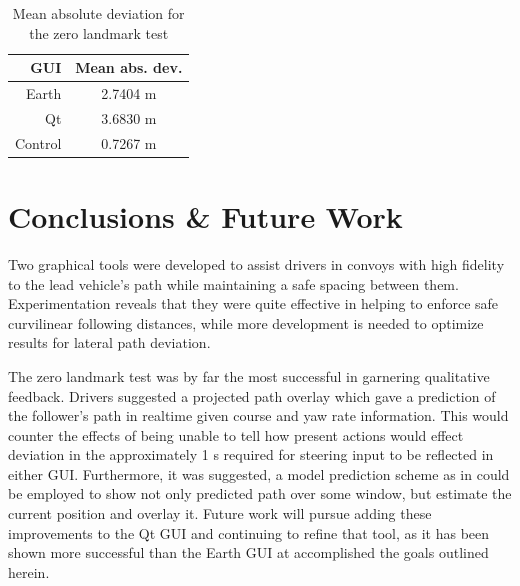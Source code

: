 \documentclass[twocolumn,10pt]{article}
\begin{document}
    \begin{table}[htbp] \centering \caption{Mean absolute deviation for the zero landmark test}
    \begin{tabular}{r|c} 
        GUI&    Mean abs. dev. \\ \hline\hline
        Earth&      2.7404 m \\
        Qt&   3.6830 m \\
        Control&    0.7267 m \\ \hline   
    \end{tabular} \label{tab:zero_dev_mean} \end{table}



\section*{Conclusions \& Future Work}

  Two graphical tools were developed to assist drivers in convoys with high fidelity to the lead vehicle’s path while maintaining a safe spacing between them.  Experimentation reveals that they were quite effective in helping to enforce safe curvilinear following distances, while more development is needed to optimize results for lateral path deviation.  

  The zero landmark test was by far the most successful in garnering qualitative feedback.  Drivers suggested a projected path overlay which gave a prediction of the follower’s path in realtime given course and yaw rate information.  This would counter the effects of being unable to tell how present actions would effect deviation in the approximately 1 s required for steering input to be reflected in either GUI.  Furthermore, it was suggested, a model prediction scheme as in \cite{williamthesis} could be employed to show not only predicted path over some window, but estimate the current position and overlay it.  Future work will pursue adding these improvements to the Qt GUI and continuing to refine that tool, as it has been shown more successful than the Earth GUI at accomplished the goals outlined herein.



\nocite{CofieldUGThesis}

\end{document}
